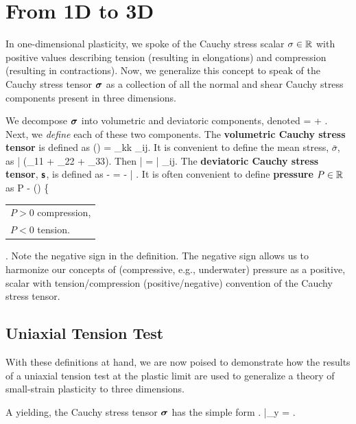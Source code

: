{%
\section{From 1D to 3D}
In one-dimensional plasticity, we spoke of the Cauchy stress scalar
$\sigma \in \mathbb{R}$ with positive values describing tension (resulting
in elongations) and compression (resulting in contractions).  
Now, we generalize this concept to speak of the Cauchy stress
tensor $\mbox{\boldmath $\sigma$}$ as a collection of all the normal and shear 
Cauchy stress components present in three dimensions.  

We decompose $\mbox{\boldmath $\sigma$}$ into volumetric and deviatoric components, 
denoted
\be
\vsigma = \vsigmavol + \vsigmadev.
\ee
Next, we {\em define} each of these two components.  
The {\bf volumetric Cauchy stress tensor} is defined as
\be
\vsigmavol {} {} \trace(\vsigma) \vid = 
 \sigma_{kk} \; \delta_{ij}.
\ee
It is convenient to define the mean stress, $\bar{\sigma}$, as
\be
\bar{\sigma}  {} 
(\sigma_{11} + \sigma_{22} + \sigma_{33}).  
\ee
Then 
\be
\vsigmavol {} \bar{\sigma} \vid = 
\bar{\sigma} \; \delta_{ij}.
\ee
The {\bf deviatoric Cauchy stress tensor},  
$\mbox{\sffamily\bfseries s}$, is defined as
\be
\tsbold {} \vsigma - \vsigmavol = \vsigma - \bar{\sigma} \; \vid.
\ee 
It is often convenient to define {\bf pressure} $P \in \mathbb{R}$ as
\be
P  -  \trace(\vsigma) \hspace{1.0cm}
  \left\{
    \begin{tabular}{l}
      $P > 0$ compression, \\
      $P < 0$ tension.
    \end{tabular}
  \right.
\ee
Note the negative sign in the definition.  The negative sign
allows us to harmonize our concepts of (compressive, e.g., 
underwater) pressure as a positive, scalar with 
tension/compression (positive/negative) convention of the Cauchy
stress tensor.


\subsection{Uniaxial Tension Test}
With these definitions at hand, we are now poised to demonstrate
how the results of a uniaxial tension test at the plastic limit
are used to generalize a theory of small-strain plasticity to
three dimensions. 

A yielding, the Cauchy stress tensor $\mbox{\boldmath $\sigma$}$ has the simple form
\be
\left.
\vsigma
\right|_y = 
.
\ee

}
